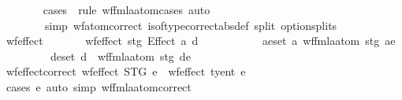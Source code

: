 \begin{isabellebody}
%
\isadelimproof
\ \ \ \ \ \ %
\endisadelimproof
%
\isatagproof
{}\isamarkupfalse%
\ {\isacharparenleft}{\kern0pt}cases\ {\isasymphi}\ rule{\isacharcolon}{\kern0pt}\ wf{\isacharunderscore}{\kern0pt}fmla{\isacharunderscore}{\kern0pt}atom{\isachardot}{\kern0pt}cases{\isacharparenright}{\kern0pt}\ {\isacharparenleft}{\kern0pt}auto\isanewline
\ \ \ \ \ \ \ \ simp{\isacharcolon}{\kern0pt}\ wf{\isacharunderscore}{\kern0pt}atom{\isacharprime}{\kern0pt}{\isacharunderscore}{\kern0pt}correct\ is{\isacharunderscore}{\kern0pt}of{\isacharunderscore}{\kern0pt}type{\isacharprime}{\kern0pt}{\isacharunderscore}{\kern0pt}correct{\isacharbrackleft}{\kern0pt}abs{\isacharunderscore}{\kern0pt}def{\isacharbrackright}{\kern0pt}\ split{\isacharcolon}{\kern0pt}\ option{\isachardot}{\kern0pt}splits{\isacharparenright}{\kern0pt}%
\endisatagproof
{\isafoldproof}%
%
\isadelimproof
\isanewline
%
\endisadelimproof
\isanewline
\ \ \ \ \isamarkupfalse%
\ wf{\isacharunderscore}{\kern0pt}effect{\isacharprime}{\kern0pt}\ \isanewline
\ \ \ \ \ \ {\isachardoublequoteopen}wf{\isacharunderscore}{\kern0pt}effect{\isacharprime}{\kern0pt}\ stg\ {\isacharparenleft}{\kern0pt}Effect\ a\ d{\isacharparenright}{\kern0pt}\ {\isasymlongleftrightarrow}\isanewline
\ \ \ \ \ \ \ \ \ \ {\isacharparenleft}{\kern0pt}{\isasymforall}ae{\isasymin}set\ a{\isachardot}{\kern0pt}\ wf{\isacharunderscore}{\kern0pt}fmla{\isacharunderscore}{\kern0pt}atom{}{\isacharprime}{\kern0pt}\ stg\ ae{\isacharparenright}{\kern0pt}\isanewline
\ \ \ \ \ \ \ \ {\isasymand}\ {\isacharparenleft}{\kern0pt}{\isasymforall}de{\isasymin}set\ d{\isachardot}{\kern0pt}\ \ wf{\isacharunderscore}{\kern0pt}fmla{\isacharunderscore}{\kern0pt}atom{}{\isacharprime}{\kern0pt}\ stg\ de{\isacharparenright}{\kern0pt}{\isachardoublequoteclose}\isanewline
\isanewline
\ \ \ \ \isamarkupfalse%
\ wf{\isacharunderscore}{\kern0pt}effect{\isacharprime}{\kern0pt}{\isacharunderscore}{\kern0pt}correct{\isacharcolon}{\kern0pt}\ {\isachardoublequoteopen}wf{\isacharunderscore}{\kern0pt}effect{\isacharprime}{\kern0pt}\ STG\ e\ {\isacharequal}{\kern0pt}\ wf{\isacharunderscore}{\kern0pt}effect\ ty{\isacharunderscore}{\kern0pt}ent\ e{\isachardoublequoteclose}\isanewline
%
\isadelimproof
\ \ \ \ \ \ %
\endisadelimproof
%
\isatagproof
{}\isamarkupfalse%
\ {\isacharparenleft}{\kern0pt}cases\ e{\isacharparenright}{\kern0pt}\ {\isacharparenleft}{\kern0pt}auto\ simp{\isacharcolon}{\kern0pt}\ wf{\isacharunderscore}{\kern0pt}fmla{\isacharunderscore}{\kern0pt}atom{}{\isacharprime}{\kern0pt}{\isacharunderscore}{\kern0pt}correct{\isacharparenright}{\kern0pt}%

\end{isabellebody}
